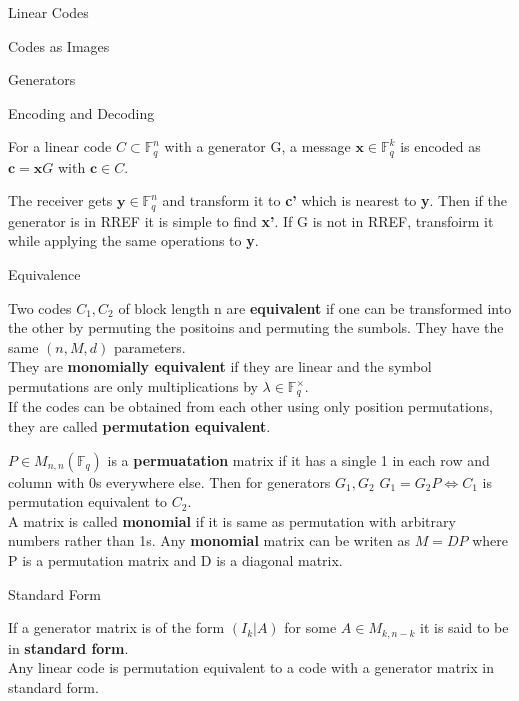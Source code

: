 \documentclass[12pt, letterpaper]{article}
\newcommand{\F}{\mathbb{F}}
\begin{document}
\begin{section}{Linear Codes}
\begin{subsection}{Codes as Images}
\begin{subsubsection}{Generators}
    \end{subsubsection}

    \begin{subsubsection}{Encoding and Decoding}

      For a linear code \(C \subset \F^{n}_{q}\) with a generator G,
      a message \(\textbf{x} \in \F^{k}_{q}\) is encoded as \(\textbf{c} =
      \textbf{x} G\) with \(\textbf{c} \in C\).

      The receiver gets \(\textbf{y} \in \F^{n}_{q}\) and transform it to
      \textbf{c'} which is nearest to \textbf{y}. Then if the generator is in
      RREF it is simple to find \textbf{x'}. If G is not in RREF, transfoirm it
      while applying the same operations to \textbf{y}.

    \end{subsubsection}

    \begin{subsubsection}{Equivalence}

      Two codes \(C_{1}, C_{2}\) of block length n are \textbf{equivalent} if
      one can be transformed into the other by permuting the positoins and
      permuting the sumbols. They have the same \((n, M, d)\) parameters. \\
      They are \textbf{monomially equivalent} if they are linear and the
      symbol permutations are only multiplications by \(\lambda \in
      \F^{\times}_{q}\). \\
      If the codes can be obtained from each other using only position
      permutations, they are called \textbf{permutation equivalent}.

      \(P \in M_{n, n}(\F_{q})\) is a \textbf{permuatation} matrix if it has a
      single 1 in each row and column with 0s everywhere else. Then for
      generators \(G_{1}, G_{2}\) \(G_{1} = G_{2} P \iff C_{1}\) is permutation
      equivalent to \(C_{2}\). \\
      A matrix is called \textbf{monomial} if it is same as permutation with
      arbitrary numbers rather than 1s. Any \textbf{monomial} matrix can be
      writen as \(M = DP\) where P is a permutation matrix and D is a diagonal
      matrix.

    \end{subsubsection}

    \begin{subsubsection}{Standard Form}

      If a generator matrix is of the form \((I_{k} | A)\) for some
      \(A \in M_{k, n - k}\) it is said to be in \textbf{standard form}. \\
      Any linear code is permutation equivalent to a code with a generator
      matrix in standard form.


\end{subsubsection}
\end{subsection}
\end{section}
\end{document}
